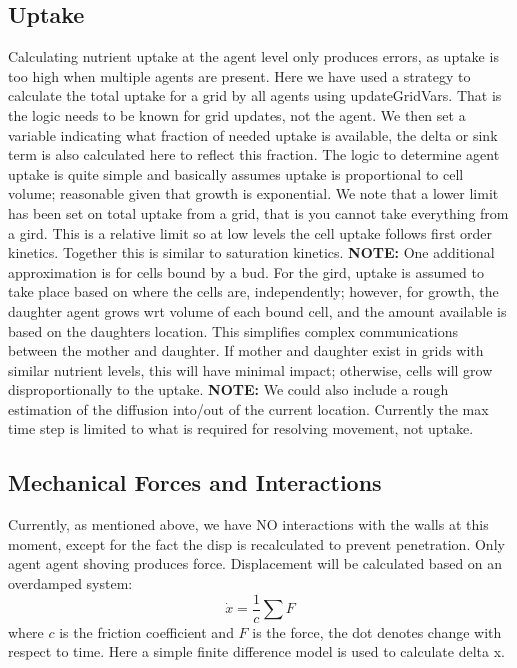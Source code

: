 \documentclass{article}
\begin{document}
\subsection{Uptake}
Calculating nutrient uptake at the agent level only produces errors, as uptake is too high when multiple agents are present.
Here we have used a strategy to calculate the total uptake for a grid by all agents using updateGridVars.
That is the logic needs to be known for grid updates, not the agent.
We then set a variable indicating what fraction of needed uptake is available,
the delta or sink term is also calculated here to reflect this fraction.
The logic to determine agent uptake is quite simple and basically assumes uptake is proportional to cell volume;
reasonable given that growth is exponential.
We note that a lower limit has been set on total uptake from a grid,
that is you cannot take everything from a gird.
This is a relative limit so at low levels the cell uptake follows first order kinetics.
Together this is similar to saturation kinetics.
\textbf{NOTE:} One additional approximation is for cells bound by a bud.
For the gird, uptake is assumed to take place based on where the cells are, independently;
however, for growth, the daughter agent grows wrt volume of each bound cell, 
and the amount available is based on the daughters location.
This simplifies complex communications between the mother and daughter.
If mother and daughter exist in grids with similar nutrient levels, 
this will have minimal impact;
otherwise, cells will grow disproportionally to the uptake.
\textbf{NOTE:} We could also include a rough estimation of the diffusion into/out of the current location.  
Currently the max time step is limited to what is required for resolving movement, not uptake.


\subsection{Mechanical Forces and Interactions}
Currently, as mentioned above, 
we have NO interactions with the walls at this moment,
except for the fact the disp is recalculated to prevent penetration.
Only agent agent shoving produces force.
Displacement will be calculated based on an overdamped system:
\begin{equation}
\dot{x} = \frac{1}{c} \sum F
\label{EQ:disp}
\end{equation}
where $c$ is the friction coefficient and $F$ is the force, the dot denotes change with respect to time.
Here a simple finite difference model is used to calculate delta x.
\end{document}
